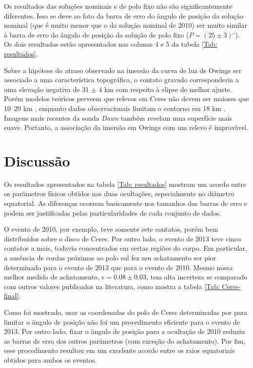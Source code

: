 \documentclass[12pt,a4paper]{monografia}
\newcommand{\degr}{\ensuremath{^{\circ}}}%
\begin{document}
Os resultados das soluções nominais e de polo fixo não são significantemente diferentes. Isso se deve ao fato da barra de erro do ângulo de posição da solução nominal (que é muito menor que o da solução nominal de 2010) ser muito similar à barra de erro do ângulo de posição da solução de polo fixo ($P = (25 \pm 3)\degr$). Os dois resultados estão apresentados nas colunas 4 e 5 da tabela \ref{Tab: resultados}.

Sobre a hipótese do atraso observado na imersão da curva de luz de Owings ser associado a uma característica topográfica, o contato gravado corresponderia a uma elevação negativa de 31 $\pm$ 4 km com respeito à elipse de melhor ajuste. Porém modelos teóricos preveem que relevos em Ceres não devem ser maiores que 10--20 km \citep{Johnson1973}, enquanto dados observacionais limitam o contorno em 18 km \citep{Carry2008}. Imagens mais recentes da sonda \textit{Dawn} também revelam uma superfície mais suave. Portanto, a associação da imersão em Owings com um relevo é improvável.

\section{Discussão}
\label{Sec: Ceres-discussao} 

\indent \indent Os resultados apresentados na tabela \ref{Tab: resultados} mostram um acordo entre os parâmetros físicos obtidos nas duas ocultações, especialmente no diâmetro equatorial. As diferenças ocorrem basicamente nos tamanhos das barras de erro e podem ser justificadas pelas particularidades de cada conjunto de dados.

O evento de 2010, por exemplo, teve somente sete contatos, porém bem distribuídos sobre o disco de Ceres. Por outro lado, o evento de 2013 teve cinco contatos a mais, todavia concentrados em certas regiões do corpo. Em particular, a ausência de cordas próximas ao polo sul fez seu achatamento ser pior determinado para o evento de 2013 que para o evento de 2010. Mesmo nossa melhor medida de achatamento, $\epsilon=0.08 \pm 0.03$, tem alta incerteza se comparado com outros valores publicados na literatura, como mostra a tabela \ref{Tab: Ceres-final}.

Como foi mostrado, usar as coordenadas do polo de Ceres determinadas por \cite{Drummond2014} para limitar o ângulo de posição não foi um procedimento eficiente para o evento de 2013. Por outro lado, fixar o ângulo de posição para a ocultação de 2010 reduziu as barras de erro dos outros parâmetros (com exceção do achatamento). Por fim, esse procedimento resultou em um excelente acordo entre os raios equatoriais obtidos para ambos os eventos.
\end{document}
